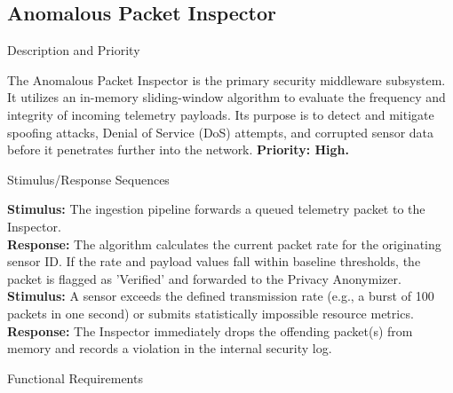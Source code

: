 \documentclass[12pt,letterpaper]{article}
\begin{document}
\subsection{Anomalous Packet Inspector}

\par\vspace{0.083in}\noindent\hspace*{0.44in}Description and Priority\par\vspace{0.083in}
\begin{list}{}{\setlength{\leftmargin}{0.94in}\setlength{\rightmargin}{0pt}}\item[]
The Anomalous Packet Inspector is the primary security middleware subsystem. It utilizes an in-memory sliding-window algorithm to evaluate the frequency and integrity of incoming telemetry payloads. Its purpose is to detect and mitigate spoofing attacks, Denial of Service (DoS) attempts, and corrupted sensor data before it penetrates further into the network. \textbf{Priority: High.}
\end{list}

\par\vspace{0.083in}\noindent\hspace*{0.44in}Stimulus/Response Sequences\par\vspace{0.083in}
\begin{list}{}{\setlength{\leftmargin}{0.94in}\setlength{\rightmargin}{0pt}}\item[]
\textbf{Stimulus:} The ingestion pipeline forwards a queued telemetry packet to the Inspector.\\
\textbf{Response:} The algorithm calculates the current packet rate for the originating sensor ID. If the rate and payload values fall within baseline thresholds, the packet is flagged as 'Verified' and forwarded to the Privacy Anonymizer.\\
\textbf{Stimulus:} A sensor exceeds the defined transmission rate (e.g., a burst of 100 packets in one second) or submits statistically impossible resource metrics.\\
\textbf{Response:} The Inspector immediately drops the offending packet(s) from memory and records a violation in the internal security log.
\end{list}

\par\vspace{0.083in}\noindent\hspace*{0.44in}Functional Requirements\par\vspace{0.083in}
\end{document}

